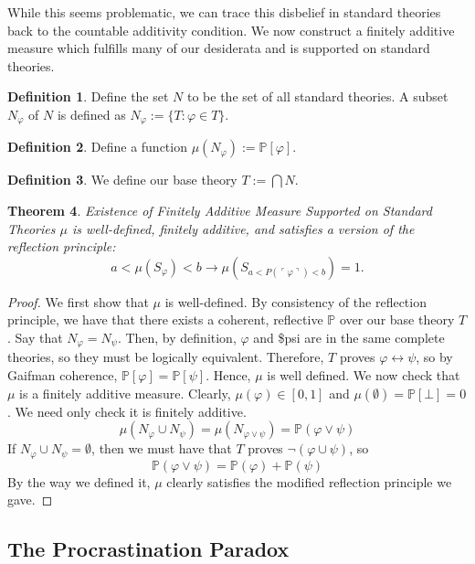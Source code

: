 \documentclass[12pt]{article}
\newcommand{\PP}{\mathbb{P}}
\newcommand{\vp}{\varphi}
\theoremstyle{plain}
\newtheorem{theorem}{Theorem}[subsection]
\theoremstyle{definition}
\newtheorem{definition}[theorem]{Definition}
\theoremstyle{remark}
\begin{document}
While this seems problematic, we can trace this disbelief in standard theories back to the countable additivity condition. We now construct a finitely additive measure which fulfills many of our desiderata and is supported on standard theories.
\begin{definition}
Define the set $N$ to be the set of all standard theories. A subset $N_{\vp}$ of $N$ is defined as $N_{\vp}:=\{T:\vp\in T\}$.
\end{definition}
\begin{definition}
Define a function $\mu(N_{\vp}):=\PP[\vp]$.
\end{definition}
\begin{definition}
We define our base theory $T:=\bigcap N$.
\end{definition}
\begin{theorem} \emph{Existence of Finitely Additive Measure Supported on Standard Theories}
$\mu$ is well-defined, finitely additive, and satisfies a version of the reflection principle:
$$a < \mu(S_{\vp}) < b \rightarrow \mu(S_{a < P(\ulcorner \vp \urcorner) < b}) = 1.$$
\end{theorem}
\begin{proof}
We first show that $\mu$ is well-defined. By consistency of the reflection principle, we have that there exists a coherent, reflective $\PP$ over our base theory $T$.
Say that $N_{\vp}=N_{\psi}$. Then, by definition, $\vp$ and \$psi are in the same complete theories, so they must be logically equivalent. Therefore, $T$ proves $\vp\leftrightarrow\psi$, so by Gaifman coherence, $\PP[\vp]=\PP[\psi]$. Hence, $\mu$ is well defined.
We now check that $\mu$ is a finitely additive measure. Clearly, $\mu(\vp)\in[0,1]$ and $\mu(\emptyset)=\PP[\bot]=0$.
We need only check it is finitely additive. 
$$\mu(N_{\vp}\cup N_{\psi})=\mu(N_{\vp\vee\psi})=\PP(\vp\vee\psi)$$
If $N_{\vp}\cup N_{\psi}=\emptyset$, then we must have that $T$ proves $\neg(\vp\cup\psi)$, so 
$$\PP(\vp\vee\psi)=\PP(\vp)+\PP(\psi)$$
By the way we defined it, $\mu$ clearly satisfies the modified reflection principle we gave.
\end{proof}
\subsection{The Procrastination Paradox}

\end{document}
